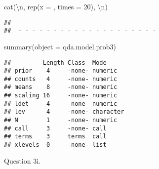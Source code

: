 \documentclass[
]{article}
\newenvironment{Shaded}{\begin{snugshade}}{\end{snugshade}}
\newcommand{\AttributeTok}[1]{\textcolor[rgb]{0.77,0.63,0.00}{#1}}
\newcommand{\DecValTok}[1]{\textcolor[rgb]{0.00,0.00,0.81}{#1}}
\newcommand{\FunctionTok}[1]{\textcolor[rgb]{0.00,0.00,0.00}{#1}}
\newcommand{\NormalTok}[1]{#1}
\newcommand{\OtherTok}[1]{\textcolor[rgb]{0.56,0.35,0.01}{#1}}
\newcommand{\SpecialCharTok}[1]{\textcolor[rgb]{0.00,0.00,0.00}{#1}}
\newcommand{\StringTok}[1]{\textcolor[rgb]{0.31,0.60,0.02}{#1}}
\begin{document}
\begin{Shaded}
\begin{Highlighting}[]
\FunctionTok{cat}\NormalTok{(}\StringTok{\textquotesingle{}}\SpecialCharTok{\textbackslash{}n}\StringTok{\textquotesingle{}}\NormalTok{, }\FunctionTok{rep}\NormalTok{(}\AttributeTok{x =} \StringTok{\textquotesingle{}{-}\textquotesingle{}}\NormalTok{, }\AttributeTok{times =} \DecValTok{20}\NormalTok{), }\StringTok{\textquotesingle{}}\SpecialCharTok{\textbackslash{}n}\StringTok{\textquotesingle{}}\NormalTok{)}
\end{Highlighting}
\end{Shaded}

\begin{verbatim}
## 
##  - - - - - - - - - - - - - - - - - - - -
\end{verbatim}

\begin{Shaded}
\begin{Highlighting}[]
\FunctionTok{summary}\NormalTok{(}\AttributeTok{object =}\NormalTok{ qda.model.prob3)}
\end{Highlighting}
\end{Shaded}

\begin{verbatim}
##         Length Class  Mode     
## prior    4     -none- numeric  
## counts   4     -none- numeric  
## means    8     -none- numeric  
## scaling 16     -none- numeric  
## ldet     4     -none- numeric  
## lev      4     -none- character
## N        1     -none- numeric  
## call     3     -none- call     
## terms    3     terms  call     
## xlevels  0     -none- list
\end{verbatim}

Question 3i.

\begin{Shaded}
\end{Shaded}
\end{document}
